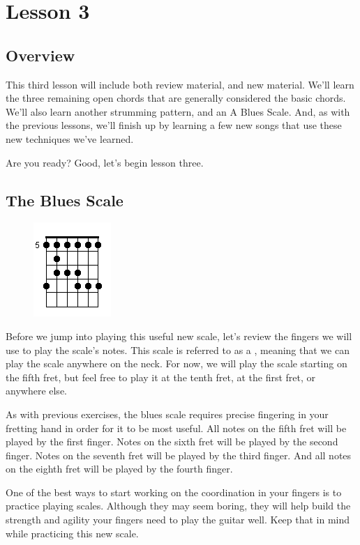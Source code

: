 \chapter{Lesson 3}
\section{Overview}
This third lesson will include both review material, and new material. We'll
learn the three remaining open chords that are generally considered the basic
chords. We'll also learn another strumming pattern, and an A Blues Scale. And,
as with the previous lessons, we'll finish up by learning a few new songs that
use these new techniques we've learned.

Are you ready? Good, let's begin lesson three.

\section{The Blues Scale}
\begin{figure}
\includegraphics{partthree/bluesscale.png}
\end{figure}

Before we jump into playing this useful new scale, let's review the fingers we
will use to play the scale's notes. This scale is referred to as a , meaning that we can play the scale anywhere on the neck. For now, we
will play the scale starting on the fifth fret, but feel free to play it at the
tenth fret, at the first fret, or anywhere else.

As with previous exercises, the blues scale requires precise fingering in your
fretting hand in order for it to be most useful. All notes on the fifth fret
will be played by the first finger. Notes on the sixth fret will be played by
the second finger. Notes on the seventh fret will be played by the third
finger. And all notes on the eighth fret will be played by the fourth finger.

One of the best ways to start working on the coordination in your fingers is to
practice playing scales. Although they may seem boring, they will help build
the strength and agility your fingers need to play the guitar well. Keep that
in mind while practicing this new scale.


